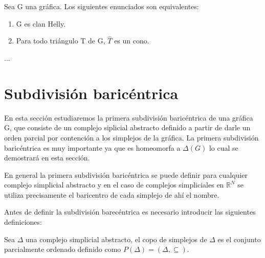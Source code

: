 
\begin{Teo}
Sea G una gráfica. Los siguientes enunciados son equivalentes:
\begin{enumerate}
\item G es clan Helly.
\item Para todo triángulo T de G, $\hat{T}$ es un cono.
\end{enumerate}
\end{Teo}
\begin{Dem}
...
\end{Dem}
\section{Subdivisión baricéntrica}
En esta sección estudiaremos la primera subdivisión baricéntrica de una gráfica G, que consiste de un complejo siplicial abstracto definido a partir de darle un orden parcial por contención a los simplejos de la gráfica. La primera subdivisión baricéntrica es muy importante ya que es homeomorfa a $\Delta(G)$ lo cual se demostrará en esta sección.

En general la primera subdivisión baricéntrica se puede definir para cualquier complejo simplicial abstracto y en el caso de complejos simpliciales en $\mathbb{R}^N$ se utiliza precisamente el baricentro de cada simplejo de ahí el nombre.

Antes de definir la subdivisión barecéntrica es necesario introducir las siguientes definiciones:

\begin{Defi}
Sea $\Delta$ una complejo simplicial abstracto, el copo de simplejos de $\Delta$ es el conjunto parcialmente ordenado definido como $P(\Delta) = (\Delta,\subseteq)$. 
\end{Defi}


